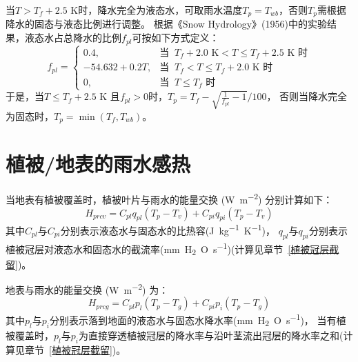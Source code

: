 当$T>T_f+2.5$ K时，降水完全为液态水，可取雨水温度$T_p=T_{wb}$，否则$T_p$需根据降水的固态与液态比例进行调整。
根据《Snow Hydrology》(1956)中的实验结果，液态水占总降水的比例$f_{pl}$可按如下方式定义：
\begin{equation*}
f_{pl}= \begin{cases}
0.4, & \text{当 }\ T_f+2.0\text{ K}<T\le T_f+2.5\text{ K} \text{ 时} \\
-54.632+0.2T, & \text{当 }\ T_f<T\le T_f+2.0\text{ K} \text{ 时} \\
0, & \text{当 }\ T\le T_f \text{ 时}
\end{cases}
\end{equation*}
于是，当$T\le T_f+2.5$ K 且$f_{pl}>0$时，$T_p=T_f-\sqrt{\frac{1}{f_{pl}}-1}/100$，
否则当降水完全为固态时，$T_p=\min{\left(T_f,T_{wb}\right)}$。


\section{植被/地表的雨水感热}\label{植被地表的雨水感热}
当地表有植被覆盖时，植被叶片与雨水的能量交换 (\unit{W.m^{-2}}) 分别计算如下：
\begin{equation}
H_{prcv}=C_{pl} q_{pl}\left(T_{p}-T_{v}\right)+C_{pi} q_{pi}\left(T_{p}-T_{v}\right)
\end{equation}
%
其中$C_{pl}$与$C_{pi}$分别表示液态水与固态水的比热容(\unit{J.kg^{-1}.K^{-1}})，
$q_{pl}$与$q_{pi}$分别表示植被冠层对液态水和固态水的截流率(\unit{mm.H_2O.s^{-1}})(计算见章节~\ref{植被冠层截留})。


地表与雨水的能量交换 (\unit{W.m^{-2}}) 为：
\begin{equation}
H_{p r c g}=C_{p l} p_{l}\left(T_{p}-T_{g}\right)+C_{p i} p_{i}\left(T_{p}-T_{g}\right)
\end{equation}
其中$p_l$与$p_i$分别表示落到地面的液态水与固态水降水率(\unit{mm.H_2O.s^{-1}})，
当有植被覆盖时，$p_l$与$p_i$为直接穿透植被冠层的降水率与沿叶茎流出冠层的降水率之和(计算见章节~\ref{植被冠层截留})。

